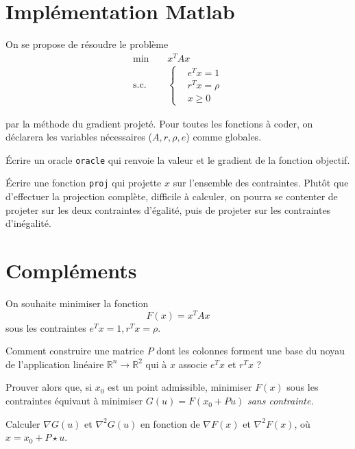 \documentclass[10pt,a4paper,fleqn]{report}
\newcommand{\R}{\mathbb R}
\newcommand{\grad}{\nabla}
\newcommand{\hess}{\nabla^2}
\newcommand{\on}{\begin{displaymath}}
\newcommand{\off}{\end{displaymath}}
\begin{document}
\section{Implémentation Matlab}
\begin{exercice}
  On se propose de résoudre le problème
\begin{align*}
  \text{min} \;\;\;\;&x^{T} A x\\
  \text{s.c.}\;\;\;\;&\begin{cases}
    &e^{T} x = 1\\
  &r^{T} x = \rho\\
  &x \geq 0
  \end{cases}
\end{align*}

par la méthode du gradient projeté. Pour toutes les fonctions à coder,
on déclarera les variables nécessaires ($A, r, \rho, e$) comme
globales.
\begin{questions}
\item Écrire un oracle \verb+oracle+ qui renvoie la valeur et le
  gradient de la fonction objectif.
\item Écrire une fonction \verb+proj+ qui projette $x$ sur l'ensemble
  des contraintes. Plutôt que d'effectuer la projection complète,
  difficile à calculer, on pourra se contenter de projeter sur les
  deux contraintes d'égalité, puis de projeter sur les contraintes
  d'inégalité.
\end{questions}

\end{exercice}

\section{Compléments}
\begin{exercice}
On souhaite minimiser la fonction
\on F(x)=x^T A x \off
sous les contraintes $e^{T} x=1, r^{T}x = \rho$.
\begin{questions}
\item Comment construire une matrice $P$ dont les colonnes forment une
  base du noyau de l'application lin\'eaire $\R^{n} \to \R^{2}$ qui
  \`a $x$ associe $e^{T} x$ et $r^{T} x$ ?
\item Prouver alors que, si $x_{0}$ est un point admissible, minimiser
  $F(x)$ sous les contraintes \'equivaut \`a minimiser $G(u)=F(x_0+P
  u)$ \it sans \rm contrainte.
\item Calculer $\grad G(u)$ et $\hess G(u)$ en fonction de $\grad
  F(x)$ et $\hess F(x)$, o\`u $x=x_0 + P \star u$.
\end{questions}
\end{exercice}
\end{document}
